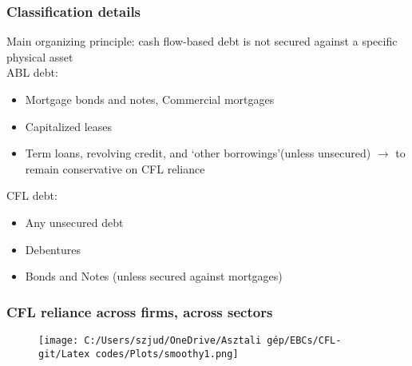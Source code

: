 \documentclass[notes]{beamer}
\begin{document}
\begin{frame}[label=Classification]
\frametitle{Classification details}
Main organizing principle: cash flow-based debt is not secured against a specific physical asset \vspace{4mm} \\
ABL debt: 
\begin{itemize}
\item Mortgage bonds and notes, Commercial mortgages
\item Capitalized leases
\item Term loans, revolving credit, and `other borrowings'(unless unsecured) $\rightarrow$ to remain conservative on CFL reliance
\end{itemize}

CFL debt: 
\begin{itemize}
\item Any unsecured debt
\item Debentures
\item Bonds and Notes (unless secured against mortgages)
\end{itemize}

\begin{center}
\hyperlink{DandC}{}
\end{center}

\end{frame}

\begin{frame}[label=Sector breakdown]
\frametitle{CFL reliance across firms, across sectors}
\begin{figure} [H]
\centering
\texttt{[image: C:/Users/szjud/OneDrive/Asztali gép/EBCs/CFL-git/Latex codes/Plots/smoothy1.png]}
\end{figure} \noindent 
\begin{center}
\hyperlink{smoothy}{} \hspace{5mm}
\end{center}

\end{frame}
\end{document}
